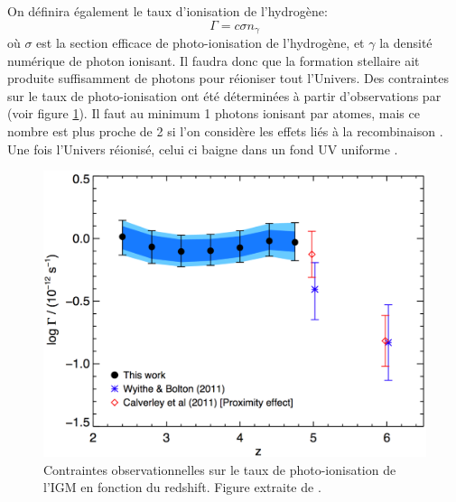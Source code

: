 On définira également le taux d'ionisation de l'hydrogène:
\begin{equation}
\Gamma = c \sigma n_\gamma
\end{equation}
où $\sigma$ est la section efficace de photo-ionisation de l'hydrogène, et $\gamma$ la densité numérique de photon ionisant.
Il faudra donc que la formation stellaire ait produite suffisamment de photons pour réioniser tout l'Univers.
Des contraintes sur le taux de photo-ionisation ont été déterminées à partir d'observations par \cite{2013MNRAS.436.1023B} (voir figure \ref{fig:photoionisationrate}).
Il faut au minimum 1 photons ionisant par atomes, mais ce nombre est plus proche de 2 si l'on considère les effets liés à la recombinaison \citep{aubert_reionization_2010}.
Une fois l'Univers réionisé, celui ci baigne dans un fond UV uniforme \citep{haardt_radiative_2012}.


\begin{figure}
        \includegraphics[width=.95\linewidth]{img/01/photon_obs.pdf} 
        \caption[Taux de photo-ionisation ]{Contraintes observationnelles sur le taux de photo-ionisation de l'\ac{IGM} en fonction du redshift. 
        Figure extraite de \cite{2013MNRAS.436.1023B}.
 		\label{fig:photoionisationrate}}
\end{figure}



\clearpage


